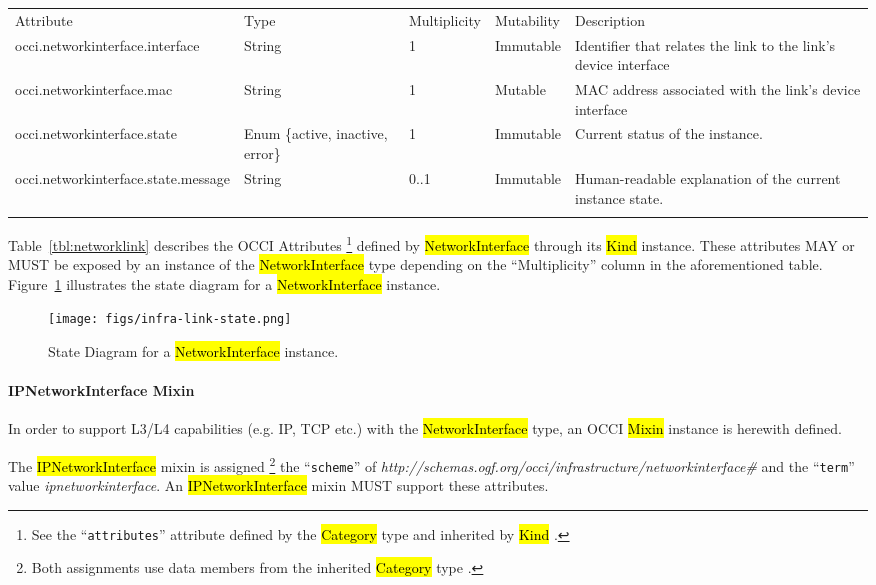 \documentclass[10pt,a4paper]{article}
\begin{document}
{
	\begin{tabular}{lp{2.5cm}p{1cm}lp{5cm}}
	\toprule
	Attribute&Type&Multi\-plicity&Mutability&Description\\
	\colrule
	occi.networkinterface.interface & String & 1 & Immutable
	& Identifier that relates the link to the link's device interface\\
	occi.networkinterface.mac & String & 1 & Mutable
	& MAC address associated with the link's device interface\\
	occi.networkinterface.state & Enum \{active, inactive, error\}& 1
	& Immutable & Current status of the instance.\\
	occi.networkinterface.state.message & String & 0..1 & Immutable
	& Human-readable explanation of the current instance state.\\
	\botrule
	\end{tabular}
}

Table~\ref{tbl:networklink} describes the OCCI Attributes%
\footnote{See the ``{\tt attributes}'' attribute defined by the
  \hl{Category} type and inherited by \hl{Kind} \cite{occi:core}.}
defined by \hl{NetworkInterface} through its \hl{Kind} instance. These
attributes MAY or MUST be exposed by an instance of the \hl{NetworkInterface} type
depending on the ``Multiplicity'' column in the aforementioned table.
Figure~\ref{fig:networklink_state} illustrates the state
diagram for a \hl{NetworkInterface} instance.

\begin{figure}[!h]
	\centering
	\texttt{[image: figs/infra-link-state.png]}
	\caption{State Diagram for a \hl{NetworkInterface} instance.}
	\label{fig:networklink_state}
\end{figure}

\paragraph{IPNetworkInterface Mixin}
In order to support L3/L4 capabilities (e.g. IP, TCP etc.) with the
\hl{NetworkInterface} type, an OCCI \hl{Mixin} instance is herewith
defined.

The \hl{IPNetworkInterface} mixin is assigned%
\footnote{Both assignments use data members from the inherited \hl{Category}
type \cite{occi:core}.}
the ``{\tt scheme}'' of
\textit{http://schemas.ogf.org/occi/infrastructure/networkinterface\#} and the ``{\tt term}'' value
\textit{ipnetworkinterface}.
An \hl{IPNetworkInterface} mixin MUST support these attributes.
\end{document}
